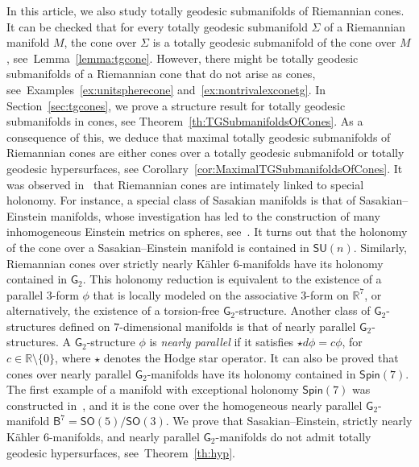 \documentclass[11pt,a4paper,final]{amsart}
\newcommand{\s}{\mathsf}
\newcommand{\R}{\mathbb{R}}
\theoremstyle{definition}
\begin{document}
In this article, we also study totally geodesic submanifolds of Riemannian cones.
It can be checked that for every totally geodesic submanifold $\Sigma$ of a Riemannian manifold $M$, the cone over $\Sigma$ is a totally geodesic submanifold of the cone over $M$, see~Lemma~\ref{lemma:tgcone}.
However, there might be totally geodesic submanifolds of a Riemannian cone that do not arise as cones, see~Examples~\ref{ex:unitspherecone} and~\ref{ex:nontrivalexconetg}.
In Section~\ref{sec:tgcones}, we prove a structure result for totally geodesic submanifolds in cones, see Theorem~\ref{th:TGSubmanifoldsOfCones}.
As a  consequence of this, we deduce that maximal totally geodesic submanifolds of Riemannian cones are either cones over a totally geodesic submanifold or totally geodesic hypersurfaces, see Corollary~\ref{cor:MaximalTGSubmanifoldsOfCones}. 
It was observed in~\cite{bar} that Riemannian cones are intimately linked to special holonomy.
For instance, a special class of Sasakian manifolds is that of Sasakian--Einstein manifolds, whose investigation has led to the construction of many inhomogeneous Einstein metrics on spheres, see~\cite{boyer}.
It turns out that the holonomy of the cone over a Sasakian--Einstein manifold is contained in $\s{SU}(n)$.
Similarly, Riemannian cones over strictly nearly Kähler $6$-manifolds have its holonomy contained in $\s{G}_2$.
This holonomy reduction is equivalent to the existence of a parallel $3$-form $\phi$ that is locally modeled on the associative $3$-form on $\R^7$, or alternatively, the existence of a torsion-free $\s{G}_2$-structure.
Another class of $\s{G}_2$-structures defined on $7$-dimensional manifolds is that of nearly parallel $\s{G}_2$-structures.
A $\s{G}_2$-structure $\phi$ is \textit{nearly parallel} if it satisfies $\star d\phi=c  \phi$, for $c\in\R\setminus\{0\}$, where $\star$ denotes the Hodge star operator. It can also be proved that cones over nearly parallel $\s{G}_2$-manifolds have its holonomy contained in $\s{Spin}(7)$.
The first example of a manifold with exceptional holonomy $\s{Spin}(7)$ was constructed in~\cite{bryant}, and it is the cone over the homogeneous nearly parallel $\s{G}_2$-manifold $\s{B}^7=\s{SO}(5)/\s{SO}(3)$.
We prove that Sasakian--Einstein, strictly nearly Kähler $6$-manifolds, and nearly parallel $\s{G}_2$-manifolds do not admit totally geodesic hypersurfaces, see~Theorem~\ref{th:hyp}.
\end{document}
